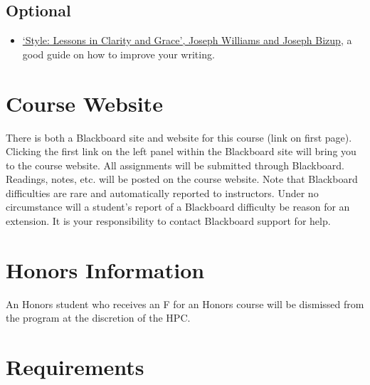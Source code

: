 \documentclass[article,oneside]{memoir}
\begin{document}
\subsection{Optional}

\begin{itemize}

\item \href{http://www.amazon.com/Style-Lessons-Clarity-Grace-11th/dp/0321898680/ref=sr_1_1?ie=UTF8&qid=1452356026&sr=8-1&keywords=lessons+in+clarity+and+grace}{`Style: Lessons in Clarity and Grace', Joseph Williams and Joseph Bizup}, a good guide on how to improve your writing. 
\end{itemize}
\section{Course Website}
There is both a Blackboard site and website for this course (link on first page). Clicking the first link on the left panel within the Blackboard site will bring you to the course website. All assignments will be submitted through Blackboard. Readings, notes, etc. will be posted on the course website. Note that Blackboard difficulties are rare and automatically reported to instructors. Under no circumstance will a student's report of a Blackboard difficulty be reason for an extension. It is your responsibility to contact Blackboard support for help.

\section{Honors Information}
An Honors student who receives an F for an Honors course will be dismissed from the program at the discretion of the HPC.

\section{Requirements}
\end{document}
